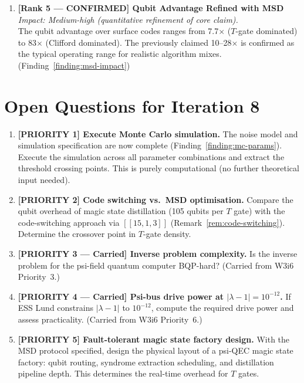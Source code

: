 \documentclass[11pt]{article}
\theoremstyle{definition}
\theoremstyle{remark}
\newcommand{\lamdiff}{|\lambda-1|}
\begin{document}
\begin{enumerate}
\item \textbf{[Rank 5 --- CONFIRMED] Qubit Advantage Refined with MSD}\\
  \textit{Impact: Medium-high (quantitative refinement of core claim).}\\
  The qubit advantage over surface codes ranges from 7.7$\times$
  ($T$-gate dominated) to 83$\times$ (Clifford dominated). The
  previously claimed 10--28$\times$ is confirmed as the typical
  operating range for realistic algorithm mixes.
  (Finding~\ref{finding:msd-impact})

\end{enumerate}

\section{Open Questions for Iteration 8}
\label{sec:open-questions}

\begin{enumerate}

\item \textbf{[PRIORITY 1] Execute Monte Carlo simulation.}
  The noise model and simulation specification are now complete
  (Finding~\ref{finding:mc-params}). Execute the simulation across
  all parameter combinations and extract the threshold crossing points.
  This is purely computational (no further theoretical input needed).

\item \textbf{[PRIORITY 2] Code switching vs.\ MSD optimisation.}
  Compare the qubit overhead of magic state distillation (105 qubits
  per $T$ gate) with the code-switching approach via $[[15,1,3]]$
  (Remark~\ref{rem:code-switching}). Determine the crossover point
  in $T$-gate density.

\item \textbf{[PRIORITY 3 --- Carried] Inverse problem complexity.}
  Is the inverse problem for the psi-field quantum computer BQP-hard?
  (Carried from W3i6 Priority~3.)

\item \textbf{[PRIORITY 4 --- Carried] Psi-bus drive power at
  $\lamdiff = 10^{-12}$.}
  If ESS Lund constrains $\lamdiff$ to $10^{-12}$, compute the
  required drive power and assess practicality.
  (Carried from W3i6 Priority~6.)

\item \textbf{[PRIORITY 5] Fault-tolerant magic state factory design.}
  With the MSD protocol specified, design the physical layout of a
  psi-QEC magic state factory: qubit routing, syndrome extraction
  scheduling, and distillation pipeline depth. This determines the
  real-time overhead for $T$ gates.

\end{enumerate}
\end{document}
